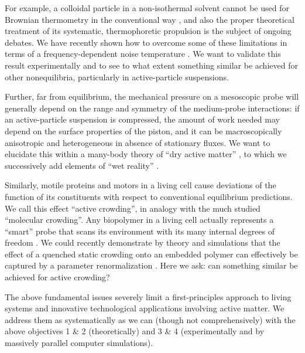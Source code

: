 \begin{workpackage}[id=WPactive,wphases=0-48,
  short=Active Particle Suspensions,%
  title=Probing active particle suspensions with colloids and polymers,
  lead=ULEI,
  ULEIRM=96,UNIPDRM=6,USTUTTRM=2]
\begin{wpdescription}
For example, a colloidal particle in a non-isothermal solvent cannot be used for Brownian thermometry 
in the conventional way \cite{rings-etal:2010,kroy:2014}, and also the proper theoretical 
treatment of its systematic, thermophoretic propulsion is the subject of ongoing debates.
%
We have recently shown how to overcome some of these limitations in terms of a frequency-dependent noise 
temperature \cite{falasco-etal:2014}.
%
We want to validate this result experimentally and to see to what extent something similar be achieved for other 
nonequilibria, particularly in active-particle suspensions.

Further, far from equilibrium, the mechanical pressure on a mesoscopic probe will generally depend on the range and 
symmetry of the medium-probe interactions: if an active-particle suspension is compressed, the
amount of work needed may depend on the surface properties of the piston, and it can be macroscopically
anisotropic and heterogeneous in absence of stationary fluxes. 
%
We want to elucidate this within a many-body theory of ``dry active matter'' \cite{marchetti-etal:2013}, 
to which we successively add elements of ``wet reality'' \cite{zoettl-stark:2014}.

Similarly, motile proteins and motors in a living cell cause deviations of the function
of its constituents with respect to conventional equilibrium predictions.  We call this
effect ``active crowding'', in analogy with the much studied ``molecular crowding''. 
%
Any biopolymer in a living cell actually represents a ``smart'' probe that scans its environment with its many 
internal degrees of freedom \cite{otto-etal:2013}.
%
We could recently demonstrate by theory and simulations that the effect of a quenched static crowding onto an embedded
polymer can effectively be captured by a parameter renormalization \cite{schoebl-etal:2014}.  
%
Here we ask: can something similar be achieved for active crowding?

The above fundamental issues severely limit a first-principles approach to living systems and
innovative technological applications involving active matter.
%
We address them as systematically as we can (though not comprehensively) with the above
objectives 1 \& 2 (theoretically) and 3 \& 4 (experimentally and by massively parallel
computer simulations).

\end{wpdescription}

\begin{tasklist}


\end{tasklist}
\end{workpackage}
